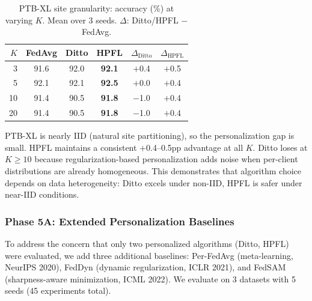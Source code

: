\documentclass[conference]{IEEEtran}
\begin{document}
\begin{table}[htbp]
\centering
\caption{PTB-XL site granularity: accuracy (\%) at varying $K$. Mean over 3 seeds. $\Delta$: Ditto/HPFL $-$ FedAvg.}
\label{tab:ptbxl_granularity}
\small
\begin{tabular}{rccc|cc}
\toprule
$K$ & FedAvg & Ditto & HPFL & $\Delta_{\text{Ditto}}$ & $\Delta_{\text{HPFL}}$ \\
\midrule
3 & 91.6 & 92.0 & \textbf{92.1} & $+$0.4 & $+$0.5 \\
5 & 92.1 & 92.1 & \textbf{92.5} & $+$0.0 & $+$0.4 \\
10 & 91.4 & 90.5 & \textbf{91.8} & $-$1.0 & $+$0.4 \\
20 & 91.4 & 90.5 & \textbf{91.8} & $-$1.0 & $+$0.4 \\
\bottomrule
\end{tabular}
\par{\footnotesize PTB-XL is nearly IID (natural site partitioning), so the personalization gap is small. HPFL maintains a consistent $+$0.4--0.5pp advantage at all $K$. Ditto loses at $K{\geq}10$ because regularization-based personalization adds noise when per-client distributions are already homogeneous. This demonstrates that algorithm choice depends on data heterogeneity: Ditto excels under non-IID, HPFL is safer under near-IID conditions.}
\end{table}

\subsubsection{Phase 5A: Extended Personalization Baselines}
\label{sec:phase5a}

To address the concern that only two personalized algorithms (Ditto, HPFL) were evaluated, we add three additional baselines: Per-FedAvg (meta-learning, NeurIPS 2020), FedDyn (dynamic regularization, ICLR 2021), and FedSAM (sharpness-aware minimization, ICML 2022). We evaluate on 3 datasets with 5 seeds (45 experiments total).
\end{document}
